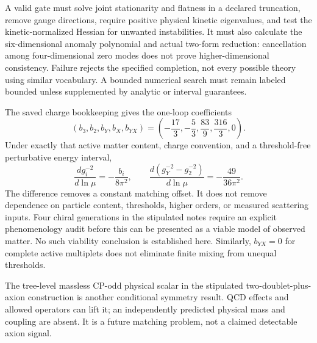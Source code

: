 A valid gate must solve joint stationarity and flatness in a declared truncation, remove gauge directions, require positive physical kinetic eigenvalues, and test the kinetic-normalized Hessian for unwanted instabilities. It must also calculate the six-dimensional anomaly polynomial and actual two-form reduction: cancellation among four-dimensional zero modes does not prove higher-dimensional consistency. Failure rejects the specified completion, not every possible theory using similar vocabulary. A bounded numerical search must remain labeled bounded unless supplemented by analytic or interval guarantees.

The saved charge bookkeeping gives the one-loop coefficients
\begin{equation}
 (b_3,b_2,b_Y,b_X,b_{YX})=
 \left(-\frac{17}{3},-\frac53,\frac{83}{9},\frac{316}{3},0\right).
\end{equation}
Under exactly that active matter content, charge convention, and a threshold-free perturbative energy interval,
\begin{equation}
 \frac{d g_i^{-2}}{d\ln\mu}=-\frac{b_i}{8\pi^2},\qquad
 \frac{d(g_Y^{-2}-g_2^{-2})}{d\ln\mu}=-\frac{49}{36\pi^2}.
 \label{eq:running}
\end{equation}
The difference removes a constant matching offset. It does not remove dependence on particle content, thresholds, higher orders, or measured scattering inputs. Four chiral generations in the stipulated notes require an explicit phenomenology audit before this can be presented as a viable model of observed matter. No such viability conclusion is established here. Similarly, $b_{YX}=0$ for complete active multiplets does not eliminate finite mixing from unequal thresholds.

The tree-level massless CP-odd physical scalar in the stipulated two-doublet-plus-axion construction is another conditional symmetry result. QCD effects and allowed operators can lift it; an independently predicted physical mass and coupling are absent. It is a future matching problem, not a claimed detectable axion signal.
